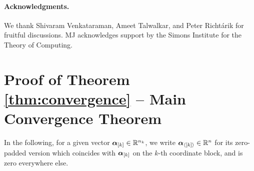 \documentclass{article} %
\begin{document}
\paragraph{Acknowledgments.}
We thank Shivaram Venkataraman, Ameet Talwalkar, and Peter Richt{\'a}rik for fruitful discussions. MJ acknowledges support by the Simons Institute for the Theory of Computing. 



{\small
%

}


\newpage
\appendix


%
\section{Proof of Theorem \ref{thm:convergence} -- Main Convergence Theorem}

\newcommand{\vsub}[2]{#1_{\langle[#2]\rangle}} %

In the following, for a given vector $\bm{\alpha}_{[k]} \in \mathbb{R}^{n_k}$, we write $\vsub{\av}{k} \in \R^n$ for its zero-padded version which coincides with $\bm{\alpha}_{[k]}$ on the $k$-th coordinate block, and is zero everywhere else.
\end{document}
